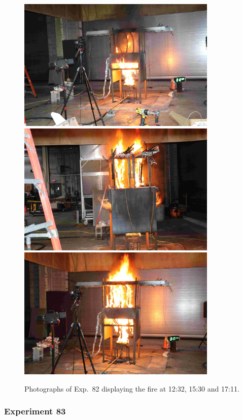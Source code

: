 \begin{figure}[p]
\centering
\includegraphics[height=2.50in]{../FIGURES/Test_82_Photo_1} \\ \vspace{0.1in}
\includegraphics[height=2.50in]{../FIGURES/Test_82_Photo_2} \\ \vspace{0.1in}
\includegraphics[height=2.50in]{../FIGURES/Test_82_Photo_3}
\caption[Photographs of Exp.~82]{Photographs of Exp.~82 displaying the fire at 12:32, 15:30 and 17:11.}
\label{fig:Test_82_photos}
\end{figure}


\clearpage

\subsubsection{Experiment 83}

